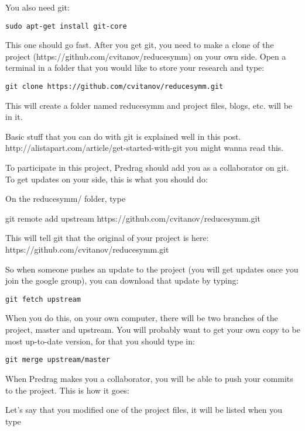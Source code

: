 \begin{description}
You also need git:

\begin{verbatim}
sudo apt-get install git-core
\end{verbatim}

This one should go fast. After you get git, you need to make a clone of the project (https://github.com/cvitanov/reducesymm) on your own side. Open a terminal in a folder that you would like to store your research and type:

\begin{verbatim}
git clone https://github.com/cvitanov/reducesymm.git
\end{verbatim}

This will create a folder named reducesymm and project files, blogs, etc. will be in it.

Basic stuff that you can do with git is explained well in this post. http://alistapart.com/article/get-started-with-git you might wanna read this.

To participate in this project, Predrag should add you as a collaborator on git. To get updates on your side, this is what you should do:

On the reducesymm/ folder, type

git remote add upstream https://github.com/cvitanov/reducesymm.git

This will tell git that the original of your project is here: https://github.com/cvitanov/reducesymm.git

So when someone pushes an update to the project (you will get updates once you join the google group), you can download that update by typing:

\begin{verbatim}
git fetch upstream
\end{verbatim}

When you do this, on your own computer, there will  be two branches of the project, master and upstream. You will probably want to get your own copy to be most up-to-date version, for that you should type in:

\begin{verbatim}
git merge upstream/master
\end{verbatim}

When Predrag makes you a collaborator, you will be able to push your commits to the project. This is how it goes:

Let's say that you modified one of the project files, it will be listed when you type


\end{description}
